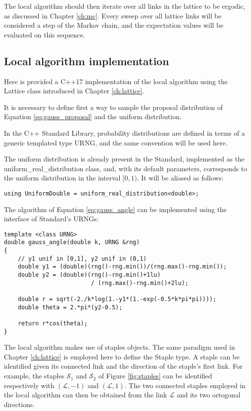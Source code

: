 The local algorithm should then iterate over all links in the lattice to be ergodic, as discussed in Chapter \ref{ch:mc}.
Every sweep over all lattice links will be considered a step of the Markov chain,
and the expectation values will be evaluated on this sequence.

\subsection*{Local algorithm implementation}
Here is provided a C++17 implementation of the local algorithm using the {\ttfamily Lattice} class introduced in Chapter \ref{ch:lattice}.

It is necessary to define first a way to sample the proposal distribution of Equation \eqref{eq:gauss_proposal} and the uniform distribution.

In the C++ Standard Library, probability distributions are defined in terms of a generic templated type {\ttfamily URNG},
and the same convention will be used here.

The uniform distribution is already present in the Standard, implemented as the {\ttfamily uniform\_real\_distribution} class,
and, with its default parameters, corresponds to the uniform distribution in the interval $[0,1)$.
It will be aliased as follows:
\begin{lstlisting}[caption={Uniform distribution sampling function}]
using UniformDouble = uniform_real_distribution<double>;
\end{lstlisting}

The algorithm of Equation \eqref{eq:gauss_angle} can be implemented using the interface of Standard's URNGs:
\begin{lstlisting}[caption={Gaussian angle distribution sampling function}]
template <class URNG>
double gauss_angle(double k, URNG &rng)
{   
    // y1 unif in [0,1], y2 unif in (0,1)
    double y1 = (double)(rng()-rng.min())/(rng.max()-rng.min());
    double y2 = (double)(rng()-rng.min()+1lu)
                         / (rng.max()-rng.min()+2lu);
    
    double r = sqrt(-2./k*log(1.-y1*(1.-exp(-0.5*k*pi*pi))));
    double theta = 2.*pi*(y2-0.5);
    
    return r*cos(theta);
}
\end{lstlisting}

The local algorithm makes use of staples objects.
The same paradigm used in Chapter \ref{ch:lattice} is employed here to define the {\ttfamily Staple} type.
A staple can be identified given its connected link and the direction of the staple's first link.
For example, the staples $\mathcal S_1$ and $\mathcal S_2$ of Figure \ref{fig:staples} can be identified respectively with
$(\mathcal L, -1)$ and $(\mathcal L, 1)$.
The two connected staples employed in the local algorithm can then be obtained from the link $\mathcal L$ and its two ortogonal directions.

